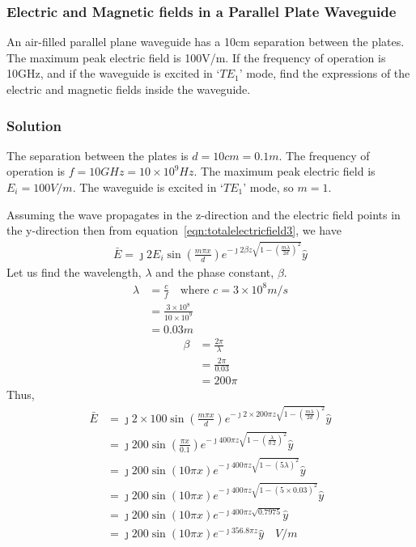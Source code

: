 \begin{exmp}
\subsubsection*{Electric and Magnetic fields in a Parallel Plate Waveguide}
An air-filled parallel plane waveguide has a 10cm separation between the plates. The maximum peak electric field is 100V/m. If the frequency of operation is 10GHz, and if the waveguide is excited in `$TE_{1}$' mode, find the expressions of the electric and magnetic fields inside the waveguide.

\subsubsection*{Solution}
The separation between the plates is $d = 10cm = 0.1m$. The frequency of operation is $f = 10GHz = 10\times 10^9Hz$. The maximum peak electric field is $E_i = 100V/m$. The waveguide is excited in `$TE_{1}$' mode, so $m=1$.

Assuming the wave propagates in the z-direction and the electric field points in the y-direction then from equation~\eqref{eqn:totalelectricfield3}, we have
\begin{align*}
\bar{E} = \jmath 2E_i\sin(\frac{m\pi x}{d})e^{-\jmath 2\beta z\sqrt{1 - \left(\frac{m\lambda}{2d}\right)^2}}\hat{y}
\end{align*}
Let us find the wavelength, $\lambda$ and the phase constant, $\beta$.
\begin{align*}
\lambda &= \frac{c}{f}\quad\text{where } c = 3\times 10^8m/s\\
&= \frac{3\times 10^8}{10\times 10^9}\\
&= 0.03m
\end{align*}
\begin{align*}
\beta &= \frac{2\pi}{\lambda}\\
&= \frac{2\pi}{0.03}\\
&= 200\pi
\end{align*}
Thus,
\begin{align*}
\bar{E} &= \jmath 2\times100\sin(\frac{m\pi x}{d})e^{-\jmath 2\times200\pi z\sqrt{1 - \left(\frac{m\lambda}{2d}\right)^2}}\hat{y}\\
&= \jmath 200\sin(\frac{\pi x}{0.1})e^{-\jmath 400\pi z\sqrt{1 - \left(\frac{\lambda}{0.2}\right)^2}}\hat{y}\\
&= \jmath 200\sin(10\pi x)e^{-\jmath 400\pi z\sqrt{1 - {(5\lambda)}^2}}\hat{y}\\
&= \jmath 200\sin(10\pi x)e^{-\jmath 400\pi z\sqrt{1 - {(5\times0.03)}^2}}\hat{y}\\
&= \jmath 200\sin(10\pi x)e^{-\jmath 400\pi z\sqrt{0.7975}}\hat{y}\\
&= \jmath 200\sin(10\pi x)e^{-\jmath 356.8\pi z}\hat{y}\quad V/m
\end{align*}


\end{exmp}
